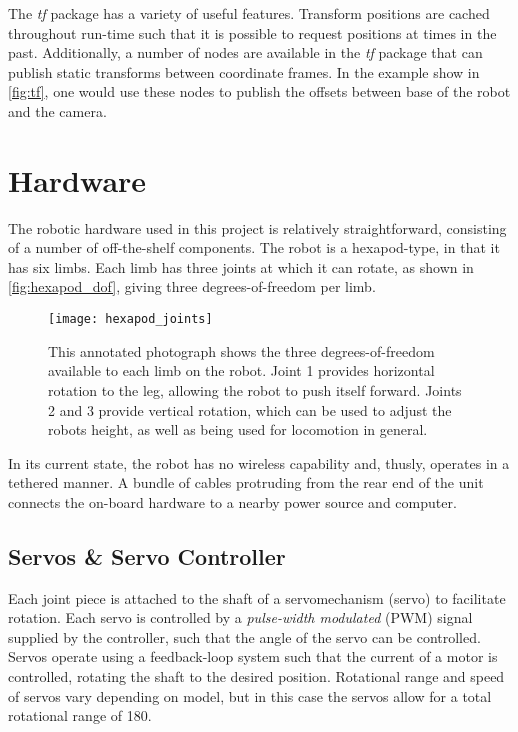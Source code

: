 The \emph{tf} package has a variety of useful features. Transform positions are cached throughout run-time such that it is possible to request positions at times in the past. Additionally, a number of nodes are available in the \emph{tf} package that can publish static transforms between coordinate frames. In the example show in \autoref{fig:tf}, one would use these nodes to publish the offsets between base of the robot and the camera.


\section{Hardware}

The robotic hardware used in this project is relatively straightforward, consisting of a number of off-the-shelf components. The robot is a hexapod-type, in that it has six limbs. Each limb has three joints at which it can rotate, as shown in \autoref{fig:hexapod_dof}, giving three degrees-of-freedom per limb. 

\begin{figure}[!h]
    \centering
    \texttt{[image: hexapod\_joints]}
    \caption{This annotated photograph shows the three degrees-of-freedom available to each limb on the robot. Joint 1 provides horizontal rotation to the leg, allowing the robot to push itself forward. Joints 2 and 3 provide vertical rotation, which can be used to adjust the robots height, as well as being used for locomotion in general.}
    \label{fig:hexapod_dof}
\end{figure}

In its current state, the robot has no wireless capability and, thusly, operates in a tethered manner. A bundle of cables protruding from the rear end of the unit connects the on-board hardware to a nearby power source and computer.

\subsection{Servos \& Servo Controller}
Each joint piece is attached to the shaft of a servomechanism (servo) to facilitate rotation. Each servo is controlled by a \emph{pulse-width modulated} (PWM) signal supplied by the controller, such that the angle of the servo can be controlled. Servos operate using a feedback-loop system such that the current of a motor is controlled, rotating the shaft to the desired position. Rotational range and speed of servos vary depending on model, but in this case the servos allow for a total rotational range of 180\textdegree.

